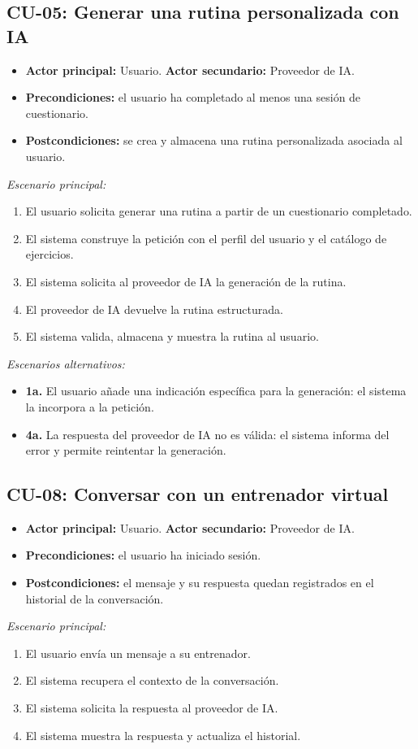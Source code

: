 \subsection*{CU-05: Generar una rutina personalizada con IA}
\begin{itemize}
    \item \textbf{Actor principal:} Usuario. \textbf{Actor secundario:} Proveedor de IA.
    \item \textbf{Precondiciones:} el usuario ha completado al menos una sesión de cuestionario.
    \item \textbf{Postcondiciones:} se crea y almacena una rutina personalizada asociada al usuario.
\end{itemize}
\textit{Escenario principal:}
\begin{enumerate}
    \item El usuario solicita generar una rutina a partir de un cuestionario completado.
    \item El sistema construye la petición con el perfil del usuario y el catálogo de ejercicios.
    \item El sistema solicita al proveedor de IA la generación de la rutina.
    \item El proveedor de IA devuelve la rutina estructurada.
    \item El sistema valida, almacena y muestra la rutina al usuario.
\end{enumerate}
\textit{Escenarios alternativos:}
\begin{itemize}
    \item \textbf{1a.} El usuario añade una indicación específica para la generación: el sistema la incorpora a la petición.
    \item \textbf{4a.} La respuesta del proveedor de IA no es válida: el sistema informa del error y permite reintentar la generación.
\end{itemize}

\subsection*{CU-08: Conversar con un entrenador virtual}
\begin{itemize}
    \item \textbf{Actor principal:} Usuario. \textbf{Actor secundario:} Proveedor de IA.
    \item \textbf{Precondiciones:} el usuario ha iniciado sesión.
    \item \textbf{Postcondiciones:} el mensaje y su respuesta quedan registrados en el historial de la conversación.
\end{itemize}
\textit{Escenario principal:}
\begin{enumerate}
    \item El usuario envía un mensaje a su entrenador.
    \item El sistema recupera el contexto de la conversación.
    \item El sistema solicita la respuesta al proveedor de IA.
    \item El sistema muestra la respuesta y actualiza el historial.
\end{enumerate}

